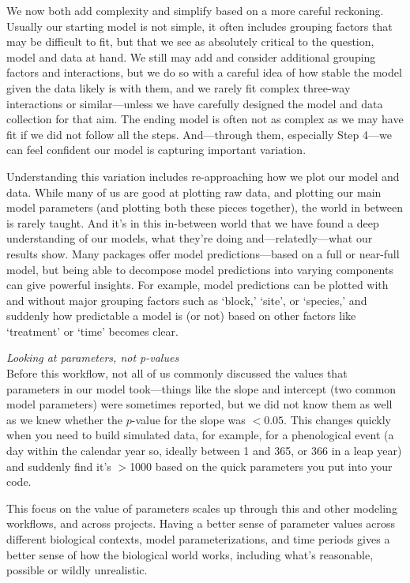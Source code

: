 \documentclass[11pt]{article}
\begin{document}
{We now both add complexity and simplify based on a more careful reckoning. Usually our starting model is not simple, it often includes grouping factors that may be difficult to fit, but that we see as absolutely critical to the question, model and data at hand. We still may add and consider additional grouping factors and interactions, but we do so with a careful idea of how stable the model given the data likely is with them, and we rarely fit complex three-way interactions or similar---unless we have carefully designed the model and data collection for that aim. The ending model is often not as complex as we may have fit if we did not follow all the steps. And---through them, especially Step 4---we can feel confident our model is capturing important variation. 

Understanding this variation includes re-approaching how we plot our model and data. While many of us are good at plotting raw data, and plotting our main model parameters (and plotting both these pieces together), the world in between is rarely taught. And it's in this in-between world that we have found a deep understanding of our models, what they're doing and---relatedly---what our results show. Many packages offer model predictions---based on a full or near-full model, but being able to decompose model predictions into varying components can give powerful insights. For example, model predictions can be plotted with and without major grouping factors such as `block,' `site', or `species,' and suddenly how predictable a model is (or not) based on other factors like `treatment' or `time' becomes clear. 

 \emph{Looking at parameters, not p-values} \\
Before this workflow, not all of us commonly discussed the values that parameters in our model took---things like the slope and intercept (two common model parameters) were sometimes reported, but we did not know them as well as we knew whether the $p$-value for the slope was $<0.05$. This changes quickly when you need to build simulated data, for example, for a phenological event (a day within the calendar year so, ideally between 1 and 365, or 366 in a leap year) and suddenly find it's $>$1000 based on the quick parameters you put into your code. 

This focus on the value of parameters scales up through this and other modeling workflows, and across projects. Having a better sense of parameter values across different biological contexts, model parameterizations, and time periods gives a better sense of how the biological world works, including what's reasonable, possible or wildly unrealistic. %

}
\end{document}
